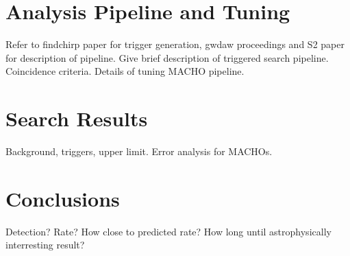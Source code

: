 
\section{Analysis Pipeline and Tuning}

Refer to findchirp paper for trigger generation, gwdaw proceedings and S2
paper for description of pipeline. Give brief description of triggered search
pipeline. Coincidence criteria. Details of tuning MACHO pipeline.

\section{Search Results}

Background, triggers, upper limit. Error analysis for MACHOs.

\section{Conclusions}

Detection? Rate? How close to predicted rate? How long until astrophysically
interresting result?

